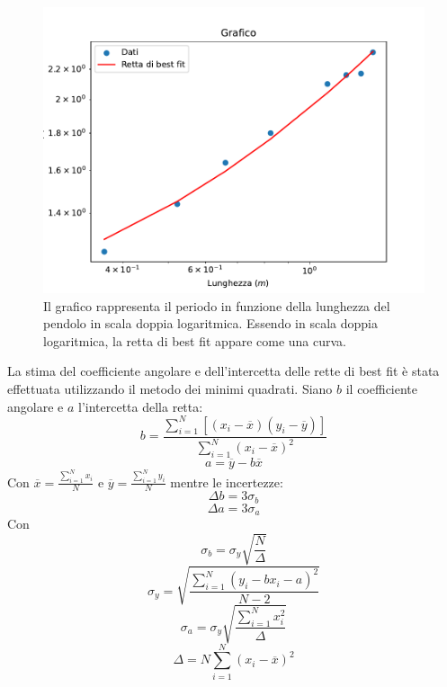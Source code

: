 \documentclass[11pt]{article}
\begin{document}
\begin{figure}[H]
  \centering
  \includegraphics[width=1\textwidth]{grafico4p2.pdf}
  \caption{Il grafico rappresenta il periodo in funzione della lunghezza del pendolo in scala doppia logaritmica. Essendo in scala doppia logaritmica, la retta di best fit appare come una curva.}
\end{figure}
La stima del coefficiente angolare e dell'intercetta delle rette di best fit è stata effettuata utilizzando il metodo dei minimi quadrati.
Siano $b$ il coefficiente angolare e $a$ l'intercetta della retta:
\begin{equation}
    b=\frac{\displaystyle\sum_{i=1}^{N}[(x_i-\overline{x})(y_i-\overline{y})]}{\displaystyle\sum_{i=1}^{N}(x_i-\overline{x})^2}
\end{equation}
\begin{equation}
    a=\overline{y}-b\overline{x}
\end{equation}
Con $\overline{x}=\frac{\displaystyle\sum_{i=1}^{N}x_i}{N}$ e $\overline{y}=\frac{\displaystyle\sum_{i=1}^{N}y_i}{N}$
mentre le incertezze:
\begin{equation}
    \Delta b=3\sigma_b
\end{equation}
\begin{equation}
    \Delta a=3\sigma_a
\end{equation}
Con $$\sigma_b=\sigma_y\sqrt{\frac{N}{\Delta}}$$
$$\sigma_y=\sqrt{\frac{\displaystyle\sum_{i=1}^{N}(y_i-bx_i-a)^2}{N-2}}$$
$$\sigma_a=\sigma_y\sqrt{\frac{\displaystyle\sum_{i=1}^{N}x_i^2}{\Delta}}$$
$$\Delta=N\displaystyle\sum_{i=1}^{N}(x_i-\overline{x})^2$$
\end{document}
